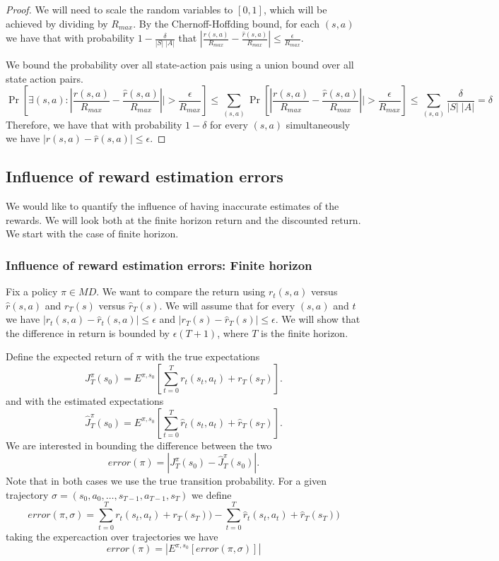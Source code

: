 \begin{proof}
We will need to scale the random variables to $[0,1]$, which will be achieved by dividing by $R_{max}$.
By the Chernoff-Hoffding bound, for each $(s,a)$ we have that with
probability $1-\frac{\delta}{|S|\;|A|}$ that
$|\frac{r(s,a)}{R_{max}}-\frac{\widehat{r}(s,a)}{R_{max}}|\leq \frac{\epsilon}{R_{max}}$.

We bound the probability over all state-action pais using a union
bound over all state action pairs.
\[
\Pr[\exists (s,a): |\frac{r(s,a)}{R_{max}}-\frac{\widehat{r}(s,a)}{R_{max}}|| > \frac{\epsilon}{R_{max}}]\leq
\sum_{(s,a)} \Pr[ |\frac{r(s,a)}{R_{max}}-\frac{\widehat{r}(s,a)}{R_{max}}|| > \frac{\epsilon}{R_{max}}] \leq
\sum_{(s,a)} \frac{\delta}{|S|\;|A|}=\delta
\]
Therefore, we have that with probability $1-\delta$ for every
$(s,a)$ simultaneously we have $|r(s,a)-\widehat{r}(s,a)|\leq \epsilon$.
\end{proof}

\subsection{Influence of reward estimation errors}

We would like to quantify the influence of having inaccurate
estimates of the rewards. We will look both at the finite horizon
return and the discounted return. We start with the case of finite
horizon.

\subsubsection{Influence of reward estimation errors: Finite horizon}

Fix a policy $\pi\in MD$. We want to compare the return using
$r_t(s,a)$ versus $\widehat{r}(s,a)$ and $r_T(s)$ versus $\widehat{r}_T(s)$.
We will assume that for every $(s,a)$ and $t$ we have
$|r_t(s,a)-\widehat{r}_t(s,a)|\leq \epsilon$ and
$|r_T(s)-\widehat{r}_T(s)|\leq \epsilon$. We will show that the
difference in return is bounded by $\epsilon(T+1)$, where $T$ is the
finite horizon.

Define the expected return of $\pi$ with the true expectations
\[
J^\pi_T(s_0)=E^{\pi,s_0}[\sum_{t=0}^T r_t(s_t,a_t)+r_T(s_T)].
\]
and with the estimated expectations
\[
\widehat{J}^\pi_T(s_0)=E^{\pi,s_0}[\sum_{t=0}^T
\widehat{r}_t(s_t,a_t)+\widehat{r}_T(s_T)].
\]
We are interested in bounding the difference between the two
\[
error(\pi)=|J^\pi_T(s_0)-\widehat{J}^\pi_T(s_0)|.
\]
Note that in both cases we use the true transition probability.
For a given trajectory $\sigma=(s_0,a_0,\ldots, s_{T-1},a_{T-1},s_T)$ we define
\[
error(\pi,\sigma)= \sum_{t=0}^T r_t(s_t,a_t)+r_T(s_T))- \sum_{t=0}^T
\widehat{r}_t(s_t,a_t)+\widehat{r}_T(s_T))
\]
taking the expercaction over trajectories we have
\[
error(\pi)=|E^{\pi,s_0}
[error(\pi,\sigma)]|
\]

